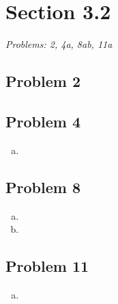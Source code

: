 \documentclass[12pt]{article}
\begin{document}
\vspace*{1cm}


\section*{Section 3.2}
\textit{Problems: 2, 4a, 8ab, 11a}
\subsection*{Problem 2}


\subsection*{Problem 4}
\begin{enumerate}[a).]
    \item {

    }
\end{enumerate}

\subsection*{Problem 8}
\begin{enumerate}[a).]
    \item {

    }
    \item {

    }
\end{enumerate}

\subsection*{Problem 11}
\begin{enumerate}[a).]
    \item {

    }
\end{enumerate}
\end{document}
